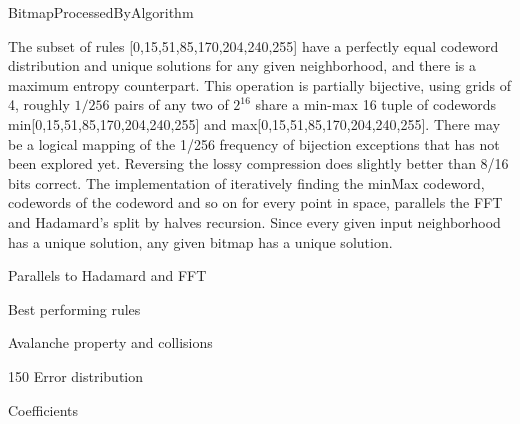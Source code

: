 \documentclass[11pt]{article}
\begin{document}
BitmapProcessedByAlgorithm

The subset of rules [0,15,51,85,170,204,240,255] have a perfectly equal codeword distribution and unique solutions for any given neighborhood, and there is a maximum entropy counterpart. This operation is partially bijective, using grids of 4, roughly $1/256$ pairs of any two of $2^16$ share a min-max 16 tuple of codewords min[0,15,51,85,170,204,240,255] and max[0,15,51,85,170,204,240,255]. There may be a logical mapping of the 1/256 frequency of bijection exceptions that has not been explored yet. Reversing the lossy compression does slightly better than 8/16 bits correct. The implementation of iteratively finding the minMax codeword, codewords of the codeword and so on for every point in space, parallels the FFT and Hadamard's split by halves recursion. Since every given input neighborhood has a unique solution, any given bitmap has a unique solution. 

Parallels to Hadamard and FFT

Best performing rules

Avalanche property and collisions

150 Error distribution

Coefficients
\end{document}

